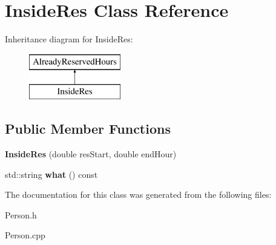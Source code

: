\hypertarget{class_inside_res}{}\section{Inside\+Res Class Reference}
\label{class_inside_res}
Inheritance diagram for Inside\+Res\+:\begin{figure}[H]
\begin{center}
\leavevmode
\includegraphics[height=2.000000cm]{class_inside_res}
\end{center}
\end{figure}
\subsection*{Public Member Functions}
\begin{DoxyCompactItemize}
\item 
\mbox{\label{class_inside_res_ad447dd2fb8257c0e07ff171b6b8403d9}} 
{\bfseries Inside\+Res} (double res\+Start, double end\+Hour)
\item 
\mbox{\label{class_inside_res_af8e96688976739ec91630a369d4b94e7}} 
std\+::string {\bfseries what} () const
\end{DoxyCompactItemize}


The documentation for this class was generated from the following files\+:\begin{DoxyCompactItemize}
\item 
Person.\+h\item 
Person.\+cpp\end{DoxyCompactItemize}
